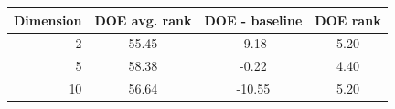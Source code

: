 \begin{tabular}{rccc}
\toprule
Dimension & DOE avg. rank & DOE - baseline & DOE rank \\
\midrule
2 & 55.45 & -9.18 & 5.20 \\
5 & 58.38 & -0.22 & 4.40 \\
10 & 56.64 & -10.55 & 5.20 \\
\bottomrule
\end{tabular}
